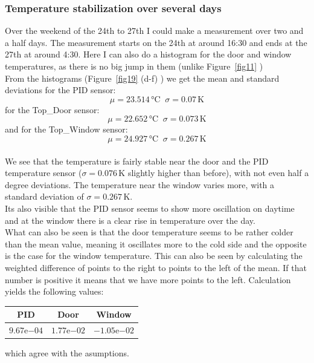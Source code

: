 \documentclass[12pt]{scrartcl}
\begin{document}
      \subsubsection{Temperature stabilization over several days}
      Over the weekend of the 24th to 27th I could make a measurement over two
      and a half days. The measurement starts on the 24th at around 16:30 and
      ends at the 27th at around 4:30. Here I can also do a histogram for the
      door and window temperatures, as there is no big jump in them (unlike
      Figure~\ref{fig11} )\\
      From the histograms (Figure~\ref{fig19} (d-f) ) we get the mean and standard deviations for the PID
      sensor: $$\mu = 23.514\,\text{°C} \;\; \sigma = 0.07\,\text{K}$$
      for the Top\_Door sensor: $$\mu = 22.652\,\text{°C} \;\; \sigma = 0.073\,\text{K}$$
      and for the Top\_Window sensor: $$\mu = 24.927\,\text{°C} \;\;
      \sigma = 0.267\,\text{K}$$ \\
      We see that the temperature is fairly stable near the door and the PID
      temperature sensor ($\sigma = 0.076 \,\text{K}$ slightly higher than before), with
      not even half a degree deviations. The temperature near the window varies
      more, with a standard deviation of $\sigma = 0.267\,\text{K}$.\\
      Its also visible that the PID sensor seems to show more oscillation on
      daytime and at the window there is a clear rise in temperature over the day.
      \\What can also be seen is that the door temperature seems to be rather
      colder than the mean value, meaning it oscillates more to the cold side
      and the opposite is the case for the window temperature. This can also be
      seen by calculating the weighted difference of points to the right to
      points to the left of the mean. If that number is positive it means that
      we have more points to the left.
      Calculation yields the following values: \vspace{-5pt}
      \begin{table}[H]
        \begin{tabular}{c | c | c}
          PID & Door & Window \\
          \hline
          $9.67\mathrm{e}{-04}$ & $1.77\mathrm{e}{-02}$ & $-1.05\mathrm{e}{-02}$
        \end{tabular}
      \end{table}
      \vspace{-5pt} which agree with the asumptions.
\end{document}
